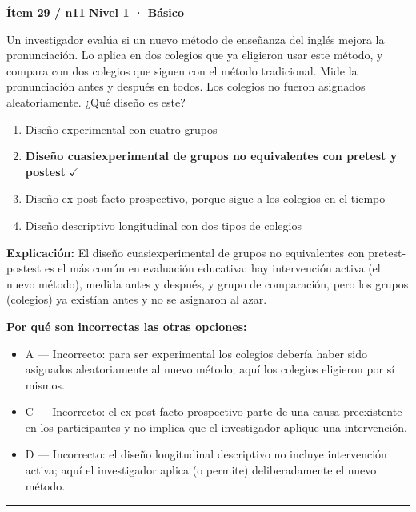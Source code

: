 \documentclass[12pt,a4paper]{article}
\begin{document}
\begin{mdframed}[backgroundcolor=fondogris,linecolor=azul,linewidth=1pt,innerleftmargin=10pt,innerrightmargin=10pt,innertopmargin=7pt,innerbottommargin=7pt]
\textbf{Ítem 29 / n11} \hfill {\small\bfseries\color{azul} Nivel 1 · Básico}
\end{mdframed}

Un investigador evalúa si un nuevo método de enseñanza del inglés mejora la pronunciación. Lo aplica en dos colegios que ya eligieron usar este método, y compara con dos colegios que siguen con el método tradicional. Mide la pronunciación antes y después en todos. Los colegios no fueron asignados aleatoriamente. ¿Qué diseño es este?

\begin{enumerate}
  \item[A.] Diseño experimental con cuatro grupos
  \item[\textbf{\color{verde}B.}] \textbf{\color{verde} Diseño cuasiexperimental de grupos no equivalentes con pretest y postest} \hfill $\checkmark$
  \item[C.] Diseño ex post facto prospectivo, porque sigue a los colegios en el tiempo
  \item[D.] Diseño descriptivo longitudinal con dos tipos de colegios
\end{enumerate}

\noindent\textbf{\color{azul}Explicación:} El diseño cuasiexperimental de grupos no equivalentes con pretest-postest es el más común en evaluación educativa: hay intervención activa (el nuevo método), medida antes y después, y grupo de comparación, pero los grupos (colegios) ya existían antes y no se asignaron al azar.

\noindent\textbf{\color{gris}Por qué son incorrectas las otras opciones:}
\begin{itemize}
  \item {\small A — Incorrecto: para ser experimental los colegios debería haber sido asignados aleatoriamente al nuevo método; aquí los colegios eligieron por sí mismos.}
  \item {\small C — Incorrecto: el ex post facto prospectivo parte de una causa preexistente en los participantes y no implica que el investigador aplique una intervención.}
  \item {\small D — Incorrecto: el diseño longitudinal descriptivo no incluye intervención activa; aquí el investigador aplica (o permite) deliberadamente el nuevo método.}
\end{itemize}
\vspace{8pt}\hrule\vspace{10pt}
\end{document}
